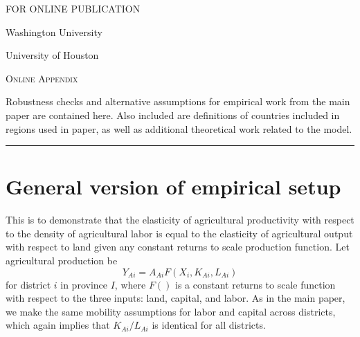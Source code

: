 \documentclass[11pt]{article}
\begin{document}
\begin{titlepage}
\hfill \textsc{FOR ONLINE PUBLICATION}

\vspace{1in} \noindent {\large \today}

\vspace{.5in} 

\vspace{.25in} 

\vspace{.05in} \noindent Washington University

\vspace{.25in} 

\vspace{.05in} \noindent University of Houston

\vspace{2in} \noindent \textsc{Online Appendix} \hrulefill

\vspace{.05in} \noindent Robustness checks and alternative assumptions for empirical work from the main paper are contained here. Also included are definitions of countries included in regions used in paper, as well as additional theoretical work related to the model.
\vspace{.1in} \hrule

\end{titlepage}

\pagebreak 

\tableofcontents

\section{General version of empirical setup}
This is to demonstrate that the elasticity of agricultural productivity with respect to the density of agricultural labor is equal to the elasticity of agricultural output with respect to land given any constant returns to scale production function. Let agricultural production be
\begin{equation}
    Y_{Ai} = A_{Ai} F(X_i,K_{Ai},L_{Ai}) 
\end{equation}
for district $i$ in province $I$, where $F()$ is a constant returns to scale function with respect to the three inputs: land, capital, and labor. As in the main paper, we make the same mobility assumptions for labor and capital across districts, which again implies that $K_{Ai}/L_{Ai}$ is identical for all districts. 
\end{document}
